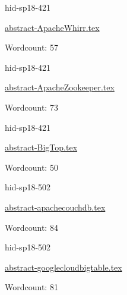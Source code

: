 

\begin{IU}

hid-sp18-421

\href{https://github.com/cloudmesh-community/hid-sp18-421/blob/master//technology/abstract-ApacheWhirr.tex}{abstract-ApacheWhirr.tex}

 

Wordcount: 57

\end{IU}



\begin{IU}

hid-sp18-421

\href{https://github.com/cloudmesh-community/hid-sp18-421/blob/master//technology/abstract-ApacheZookeeper.tex}{abstract-ApacheZookeeper.tex}

 

Wordcount: 73

\end{IU}



\begin{IU}

hid-sp18-421

\href{https://github.com/cloudmesh-community/hid-sp18-421/blob/master//technology/abstract-BigTop.tex}{abstract-BigTop.tex}

 

Wordcount: 50

\end{IU}



\begin{IU}

hid-sp18-502

\href{https://github.com/cloudmesh-community/hid-sp18-502/blob/master//technology/abstract-apachecouchdb.tex}{abstract-apachecouchdb.tex}

 

Wordcount: 84

\end{IU}



\begin{IU}

hid-sp18-502

\href{https://github.com/cloudmesh-community/hid-sp18-502/blob/master//technology/abstract-googlecloudbigtable.tex}{abstract-googlecloudbigtable.tex}

 

Wordcount: 81

\end{IU}

